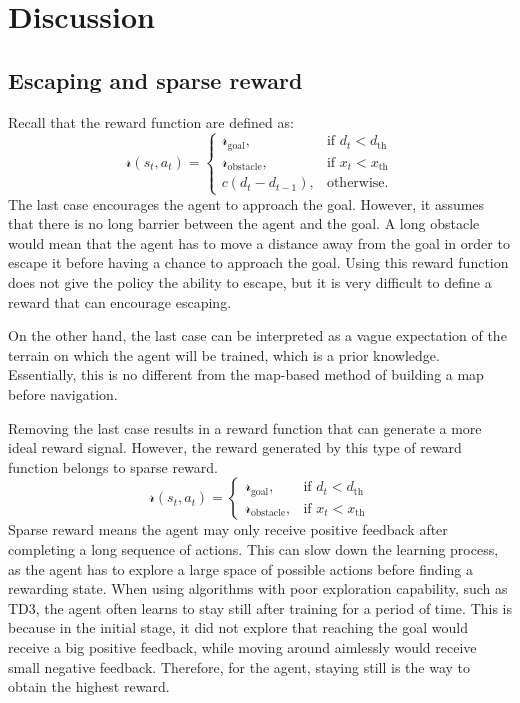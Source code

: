 \newpage
\section{Discussion} \label{sec:discussion}

\subsection{Escaping and sparse reward}

Recall that the reward function are defined as:
\begin{equation*}
    \mathcal{r}(s_t, a_t) = \begin{cases}
    \mathcal{r}_\text{goal}, &\text{if $d_t < d_\text{th}$}\\
    \mathcal{r}_\text{obstacle}, &\text{if $x_t < x_\text{th}$}\\
    c (d_t - d_{t-1}), &\text{otherwise.}
    \end{cases}
\end{equation*}
The last case encourages the agent to approach the goal. However, it assumes that there is no long barrier between the agent and the goal. A long obstacle would mean that the agent has to move a distance away from the goal in order to escape it before having a chance to approach the goal. Using this reward function does not give the policy the ability to escape, but it is very difficult to define a reward that can encourage escaping.

On the other hand, the last case can be interpreted as a vague expectation of the terrain on which the agent will be trained, which is a prior knowledge. Essentially, this is no different from the map-based method of building a map before navigation.

Removing the last case results in a reward function that can generate a more ideal reward signal. However, the reward generated by this type of reward function belongs to sparse reward.
\begin{equation*}
    \mathcal{r}(s_t, a_t) = \begin{cases}
    \mathcal{r}_\text{goal}, &\text{if $d_t < d_\text{th}$}\\
    \mathcal{r}_\text{obstacle}, &\text{if $x_t < x_\text{th}$}
    \end{cases}
\end{equation*}
Sparse reward means the agent may only receive positive feedback after completing a long sequence of actions. This can slow down the learning process, as the agent has to explore a large space of possible actions before finding a rewarding state. When using algorithms with poor exploration capability, such as TD3, the agent often learns to stay still after training for a period of time. This is because in the initial stage, it did not explore that reaching the goal would receive a big positive feedback, while moving around aimlessly would receive small negative feedback. Therefore, for the agent, staying still is the way to obtain the highest reward.

